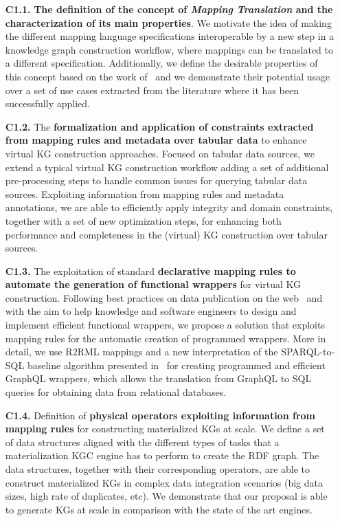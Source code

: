 \begin{enumerate}
    \item[\textbf{C1.1.}] \textbf{The definition of the concept of \textit{Mapping Translation} and the characterization of its main properties}. We motivate the idea of making the different mapping language specifications interoperable by a new step in a knowledge graph construction workflow, where mappings can be translated to a different specification. Additionally, we define the desirable properties of this concept based on the work of~\citep{hartig2017foundations} and we demonstrate their potential usage over a set of use cases extracted from the literature where it has been successfully applied.
    \item[\textbf{C1.2.}] The \textbf{formalization and application of constraints extracted from mapping rules and metadata over tabular data} to enhance virtual KG construction approaches. Focused on tabular data sources, we extend a typical virtual KG construction workflow adding a set of additional pre-processing steps to handle common issues for querying tabular data sources. Exploiting information from mapping rules and metadata annotations, we are able to efficiently apply integrity and domain constraints, together with a set of new optimization steps, for enhancing both performance and completeness in the (virtual) KG construction over tabular sources.
    \item[\textbf{C1.3.}] The exploitation of standard \textbf{declarative mapping rules to automate the generation of functional wrappers} for virtual KG construction. Following best practices on data publication on the web~\citep{bizer2011linked} and with the aim to help knowledge and software engineers to design and implement efficient functional wrappers, we propose a solution that exploits mapping rules for the automatic creation of programmed wrappers. More in detail, we use R2RML mappings and a new interpretation of the SPARQL-to-SQL baseline algorithm presented in~\citep{chebotko2009semantics} for creating programmed and efficient GraphQL wrappers, which allows the translation from GraphQL to SQL queries for obtaining data from relational databases.
    \item[\textbf{C1.4.}] Definition of \textbf{physical operators exploiting information from mapping rules} for constructing materialized KGs at scale. We define a set of data structures aligned with the different types of tasks that a materialization KGC engine has to perform to create the RDF graph. The data structures, together with their corresponding operators, are able to construct materialized KGs in complex data integration scenarios (big data sizes, high rate of duplicates, etc). We demonstrate that our proposal is able to generate KGs at scale in comparison with the state of the art engines. 

\end{enumerate}
